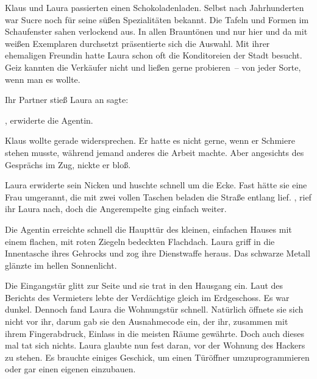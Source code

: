 \par

Klaus und Laura passierten einen Schokoladenladen. Selbst nach Jahrhunderten war Sucre noch für seine süßen Spezialitäten bekannt. Die Tafeln und Formen im Schaufenster sahen verlockend aus. In allen Brauntönen und nur hier und da mit weißen Exemplaren durchsetzt präsentierte sich die Auswahl. Mit ihrer ehemaligen Freundin hatte Laura schon oft die Konditoreien der Stadt besucht. Geiz kannten die Verkäufer nicht und ließen gerne probieren~-- von jeder Sorte, wenn man es wollte.

\par

Ihr Partner stieß Laura an sagte: 

\par

, erwiderte die Agentin. 

\par

Klaus wollte gerade widersprechen. Er hatte es nicht gerne, wenn er Schmiere stehen musste, während jemand anderes die Arbeit machte. Aber angesichts des Gesprächs im Zug, nickte er bloß.

\par

Laura erwiderte sein Nicken und huschte schnell um die Ecke. Fast hätte sie eine Frau umgerannt, die mit zwei vollen Taschen beladen die Straße entlang lief. , rief ihr Laura nach, doch die Angerempelte ging einfach weiter.

\par

Die Agentin erreichte schnell die Haupttür des kleinen, einfachen Hauses mit einem flachen, mit roten Ziegeln bedeckten Flachdach. Laura griff in die Innentasche ihres Gehrocks und zog ihre Dienstwaffe heraus. Das schwarze Metall glänzte im hellen Sonnenlicht.

\par

Die Eingangstür glitt zur Seite und sie trat in den Hausgang ein. Laut des Berichts des Vermieters lebte der Verdächtige gleich im Erdgeschoss. Es war dunkel. Dennoch fand Laura die Wohnungstür schnell. Natürlich öffnete sie sich nicht vor ihr, darum gab sie den Ausnahmecode ein, der ihr, zusammen mit ihrem Fingerabdruck, Einlass in die meisten Räume gewährte. Doch auch dieses mal tat sich nichts. Laura glaubte nun fest daran, vor der Wohnung des Hackers zu stehen. Es brauchte einiges Geschick, um einen Türöffner umzuprogrammieren oder gar einen eigenen einzubauen.

